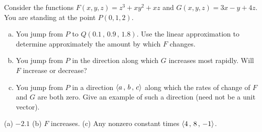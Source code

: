 \begin{question}[M200 2016D] %
Consider the functions $F(x,y,z) = z^3 +xy^2 +xz$ and $G(x,y,z)=3x-y+4z$.
You are standing at the point $P(0,1,2)$.
\begin{enumerate}[(a)]
\item
You jump from $P$ to $Q(0.1\,,\,0.9\,,\,1.8)$. Use the linear approximation
to determine approximately the amount by which $F$ changes.

\item
You jump from $P$ in the direction along which $G$ increases most rapidly.
Will $F$ increase or decrease?

\item
You jump from $P$ in a direction $\left< a\,,\,b\,,\,c\right>$ along which the rates 
of change of $F$ and $G$ are both zero. Give an example of such a direction
(need not be a unit vector).

\end{enumerate}
\end{question}

%

\begin{answer}
(a) $-2.1$\qquad
(b) $F$ increases.\qquad
(c) Any nonzero constant times $\left< 4 \,,\, 8 \,,\, -1 \right>$.
\end{answer}

